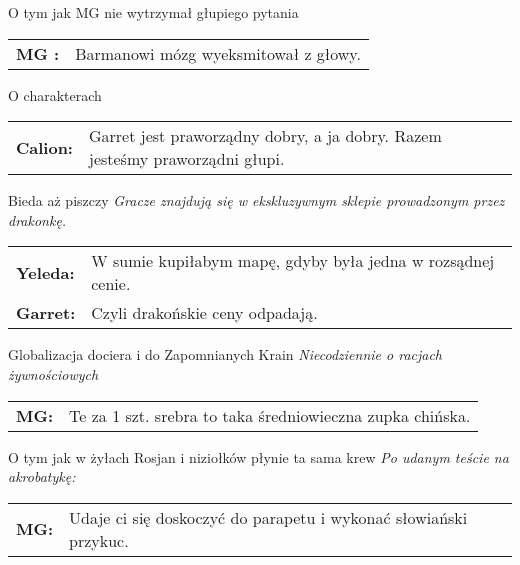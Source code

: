 \documentclass[10pt,twoside,twocolumn]{book}
\begin{document}
\begin{rpg-quotebox}{O tym jak MG nie wytrzymał głupiego pytania}
   \begin{tabularx}{\columnwidth}{lX}
      \textbf{MG :} & Barmanowi mózg wyeksmitował z głowy.\\
   \end{tabularx}
\end{rpg-quotebox}


\begin{rpg-quotebox}{O charakterach}
   \begin{tabularx}{\columnwidth}{lX}
      \textbf{Calion:} & Garret jest praworządny dobry, a ja dobry. Razem jesteśmy praworządni głupi.\\
   \end{tabularx}
\end{rpg-quotebox}


\begin{rpg-quotebox}{Bieda aż piszczy}
   \textit{Gracze znajdują się w ekskluzywnym sklepie prowadzonym przez drakonkę.} \\

   \begin{tabularx}{\columnwidth}{lX}
      \textbf{Yeleda:} & W sumie kupiłabym mapę, gdyby była jedna w rozsądnej cenie.\\
      \textbf{Garret:} & Czyli drakońskie ceny odpadają.\\
   \end{tabularx}
\end{rpg-quotebox}


\begin{rpg-quotebox}{Globalizacja dociera i do Zapomnianych Krain}
   \textit{Niecodziennie o racjach żywnościowych} \\

   \begin{tabularx}{\columnwidth}{lX}
      \textbf{MG:} & Te za 1 szt. srebra to taka średniowieczna zupka chińska.\\
   \end{tabularx}
\end{rpg-quotebox}


\begin{rpg-quotebox}{O tym jak w żyłach Rosjan i niziołków płynie ta sama krew}
   \textit{Po udanym teście na akrobatykę:}\\

   \begin{tabularx}{\columnwidth}{lX}
      \textbf{MG:} & Udaje ci się doskoczyć do parapetu i wykonać słowiański przykuc.\\
   \end{tabularx}
\end{rpg-quotebox}
\end{document}
